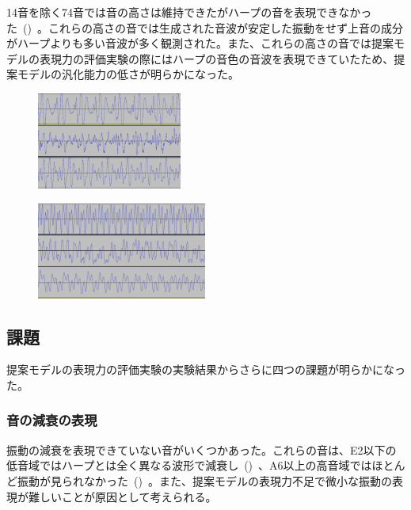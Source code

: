 14音を除く74音では音の高さは維持できたがハープの音を表現できなかった~()~。これらの高さの音では生成された音波が安定した振動をせず上音の成分がハープよりも多い音波が多く観測された。また、これらの高さの音では提案モデルの表現力の評価実験の際にはハープの音色の音波を表現できていたため、提案モデルの汎化能力の低さが明らかになった。

\begin{figure}[b]
\centering
\begin{minipage}[b]{0.48\columnwidth}
\centering
\includegraphics[height=90pt]{figure/66_22_det/d1_0300_0500.png}
\label{fig:66_22_bad1}
\end{minipage}
\begin{minipage}[b]{0.48\columnwidth}
\centering
\includegraphics[height=90pt]{figure/66_22_det/f6_0070_0080.png}
\label{fig:66_22_bad2}
\end{minipage}
\caption[実験2：ハープの音を表現できず音の高さを維持できた音波]{}
\label{fig:66_22_bad}
\end{figure}

\subsection{課題}

提案モデルの表現力の評価実験の実験結果からさらに四つの課題が明らかになった。

\subsubsection{音の減衰の表現}

振動の減衰を表現できていない音がいくつかあった。これらの音は、E2以下の低音域ではハープとは全く異なる波形で減衰し~()~、A6以上の高音域ではほとんど振動が見られなかった~()~。また、提案モデルの表現力不足で微小な振動の表現が難しいことが原因として考えられる。

